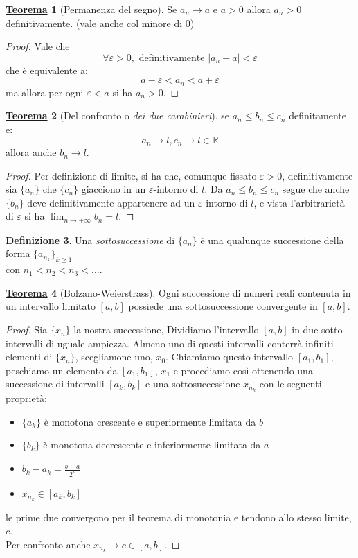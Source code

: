 \documentclass[a4paper,twoside]{article}
\renewcommand{\epsilon}{\varepsilon}
\newcommand{\R}{\mathbb{R}}
\theoremstyle{definition}
\newtheorem{theorem}{\color{Red}\underline{\textrm Teorema}}
\newtheorem{definizione}[theorem]{Definizione}
\numberwithin{theorem}{section}
\begin{document}
\begin{theorem}[Permanenza del segno]
Se $a_n \to a$ e $a>0$ allora $a_n>0$ definitivamente.
(vale anche col minore di 0)
\end{theorem}
\begin{proof}
Vale che $$\forall\epsilon>0,\text{ definitivamente }|a_n-a|<\epsilon$$
che è equivalente a:
$$a-\epsilon<a_n<a+\epsilon$$
ma allora per ogni $\epsilon < a$ si ha $a_n>0$.
\end{proof}

\begin{theorem}[Del confronto o \emph{dei due carabinieri}]
se $a_n\leq b_n \leq c_n$ definitamente e: 
$$a_n\to l, c_n \to l \in \R$$
allora anche $b_n\to l$.
\end{theorem}
\begin{proof}
Per definizione di limite, si ha che, comunque fissato $\epsilon >0$, definitivamente sia $\{a_n\}$ che $\{c_n\}$ giacciono in un $\epsilon$-intorno di $l$. Da $a_n\leq b_n\leq c_n$ segue che anche $\{b_n\}$ deve  definitivamente appartenere ad un $\epsilon$-intorno di $l$, e vista l'arbitrarietà di $\epsilon$ si ha $\lim_{n\to +\infty} b_n = l$. 
\end{proof}

\begin{definizione} Una \emph{sottosuccessione} di $\{a_n\}$ è una qualunque successione della forma $\{a_{n_k}\}_{k\geq 1}$\\ con $n_1 < n_2 < n_3 < \ldots$. 
\end{definizione}

\begin{theorem}[Bolzano-Weierstrass]
Ogni successione di numeri reali contenuta in un intervallo limitato $[a,b]$ possiede una sottosuccessione convergente in $[a,b]$.\end{theorem}
\begin{proof}
Sia $\{x_n\}$ la nostra successione, Dividiamo l'intervallo $[a,b]$ in due sotto intervalli di uguale ampiezza. Almeno uno di questi intervalli conterrà infiniti elementi di $\{x_n\}$, scegliamone uno, $x_0$. Chiamiamo questo intervallo $[a_1,b_1]$, peschiamo un elemento da $[a_1,b_1]$, $x_1$ e procediamo così ottenendo una successione di intervalli $[a_k,b_k]$ e una sottosuccessione $x_{n_k}$ con le seguenti proprietà:
\begin{itemize}
\item $\{a_k\}$ è monotona crescente e superiormente limitata da $b$
\item $\{b_k\}$ è monotona decrescente e inferiormente limitata da $a$
\item $b_k-a_k=\frac{b-a}{2^k}$
\item $x_{n_k}\in [a_k,b_k]$
\end{itemize}
le prime due convergono per il teorema di monotonia e tendono allo stesso limite, $c$.\\ Per confronto anche $x_{n_k}\to c\in [a,b]$.
\end{proof}
\end{document}
